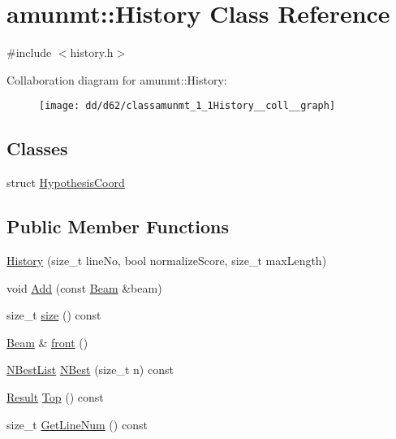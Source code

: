 \hypertarget{classamunmt_1_1History}{}\section{amunmt\+:\+:History Class Reference}
\label{classamunmt_1_1History}


{\ttfamily \#include $<$history.\+h$>$}



Collaboration diagram for amunmt\+:\+:History\+:
\nopagebreak
\begin{figure}[H]
\begin{center}
\leavevmode
\texttt{[image: dd/d62/classamunmt\_1\_1History\_\_coll\_\_graph]}
\end{center}
\end{figure}
\subsection*{Classes}
\begin{DoxyCompactItemize}
\item 
struct \hyperlink{structamunmt_1_1History_1_1HypothesisCoord}{Hypothesis\+Coord}
\end{DoxyCompactItemize}
\subsection*{Public Member Functions}
\begin{DoxyCompactItemize}
\item 
\hyperlink{classamunmt_1_1History_a9fd2660a9cb09d6659382d7a440f8c11}{History} (size\+\_\+t line\+No, bool normalize\+Score, size\+\_\+t max\+Length)
\item 
void \hyperlink{classamunmt_1_1History_a2b05a26f7874eb4e85f66e27458b18c1}{Add} (const \hyperlink{namespaceamunmt_a534a3a9a1d99c01a5adf05e700a26012}{Beam} \&beam)
\item 
size\+\_\+t \hyperlink{classamunmt_1_1History_af2af49a16004f49ddb5b1eacc9abe43f}{size} () const 
\item 
\hyperlink{namespaceamunmt_a534a3a9a1d99c01a5adf05e700a26012}{Beam} \& \hyperlink{classamunmt_1_1History_a2067358d635e512d2c1262288cbdae5d}{front} ()
\item 
\hyperlink{namespaceamunmt_a4ad8f6c25b18c8675040456c6e95e0f6}{N\+Best\+List} \hyperlink{classamunmt_1_1History_af982104b58a4d8cf3893d39724a120c4}{N\+Best} (size\+\_\+t n) const 
\item 
\hyperlink{namespaceamunmt_af12bd731cf50f363bdcbec0f435bafb1}{Result} \hyperlink{classamunmt_1_1History_a1ba4f3d97546a08e25a9c0de1ef02e50}{Top} () const 
\item 
size\+\_\+t \hyperlink{classamunmt_1_1History_aab6c98bebac14e388e23ea849b0bba8b}{Get\+Line\+Num} () const 
\end{DoxyCompactItemize}
